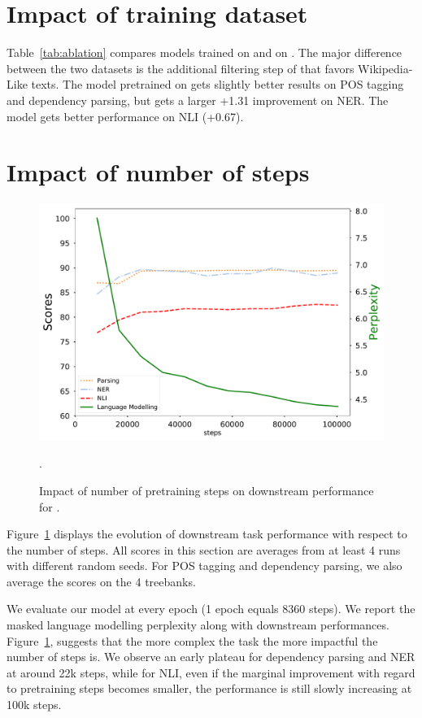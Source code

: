 \section{Impact of training dataset}

Table~\ref{tab:ablation} compares models trained on \ccnet and on \oscar.
The major difference between the two datasets is the additional filtering step of \ccnet that favors Wikipedia-Like texts.
The model pretrained on \oscar gets slightly better results on POS tagging and dependency parsing, but gets a larger +1.31 improvement on NER.
The \ccnet model gets better performance on NLI (+0.67).

\section{Impact of number of steps}
\label{sec:nbsteps}

\begin{figure}[t]
    \centering
    \includegraphics[width=0.75\linewidth]{static/media/mod_eval/camembert/plot_steps_impact_4.pdf}
    \caption{Impact of number of pretraining steps on downstream performance for \camembert.}.
    \label{fig:n_steps_impact}
\end{figure}


Figure~\ref{fig:n_steps_impact} displays the evolution of downstream task performance with respect to the number of steps. All scores in this section are averages from at least 4 runs with different random seeds. For POS tagging and dependency parsing, we also average the scores on the 4 treebanks.

We evaluate our model at every epoch (1 epoch equals 8360 steps). We report the masked language modelling perplexity along with downstream performances.
Figure~\ref{fig:n_steps_impact}, suggests that the more complex the task the more impactful the number of steps is. We observe an early plateau for dependency parsing and NER at around 22k steps, while for NLI, even if the marginal improvement with regard to pretraining steps becomes smaller, the performance is still slowly increasing at 100k steps.

